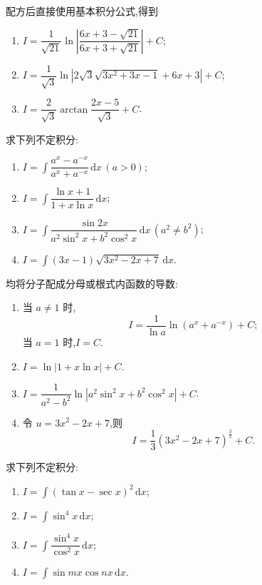 \begin{solution}
    配方后直接使用基本积分公式,得到
    \begin{enumerate}
        \item $\displaystyle I=\dfrac{1}{\sqrt{21}}\ln\left|\dfrac{6x+3-\sqrt{21}}{6x+3+\sqrt{21}}\right|+C$;
        \item $\displaystyle I=\dfrac{1}{\sqrt3}\ln\left|2\sqrt3\sqrt{3x^2+3x-1}+6x+3\right|+C$;
        \item $\displaystyle I=\dfrac{2}{\sqrt3}\arctan\dfrac{2x-5}{\sqrt3}+C$.
    \end{enumerate}
\end{solution}

\begin{example}
    求下列不定积分:
    \begin{enumerate}
        \item $\displaystyle I=\int\dfrac{a^x-a^{-x}}{a^x+a^{-x}}\,\mathrm{d}x\,(a>0)$;
        \item $\displaystyle I=\int\dfrac{\ln x+1}{1+x\ln x}\,\mathrm{d}x$;
        \item $\displaystyle I=\int\dfrac{\sin2x}{a^2\sin^2x+b^2\cos^2x}\,\mathrm{d}x\,(a^2\neq b^2)$;
        \item $\displaystyle I=\int(3x-1)\sqrt{3x^2-2x+7}\,\mathrm{d}x$.
    \end{enumerate}
\end{example}
\exampleblank

\begin{solution}
    均将分子配成分母或根式内函数的导数:
    \begin{enumerate}
        \item 当 $a\neq1$ 时,
              \[
                  I=\dfrac{1}{\ln a}\ln(a^x+a^{-x})+C;
              \]
              当 $a=1$ 时,$I=C$.
        \item $\displaystyle I=\ln|1+x\ln x|+C$.
        \item $\displaystyle I=\dfrac{1}{a^2-b^2}\ln|a^2\sin^2x+b^2\cos^2x|+C$.
        \item 令 $u=3x^2-2x+7$,则
              \[
                  I=\dfrac{1}{3}(3x^2-2x+7)^{\frac{3}{2}}+C.
              \]
    \end{enumerate}
\end{solution}

\begin{example}
    求下列不定积分:
    \begin{enumerate}
        \item $\displaystyle I=\int(\tan x-\sec x)^2\,\mathrm{d}x$;
        \item $\displaystyle I=\int\sin^4x\,\mathrm{d}x$;
        \item $\displaystyle I=\int\dfrac{\sin^4x}{\cos^2x}\,\mathrm{d}x$;
        \item $\displaystyle I=\int\sin mx\cos nx\,\mathrm{d}x$.
    \end{enumerate}
\end{example}
\exampleblank

